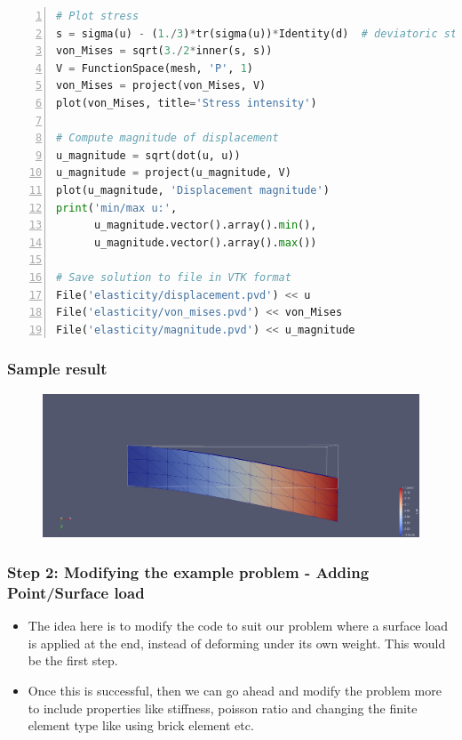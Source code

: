 \documentclass{beamer}
\begin{document}
\begin{frame}
\begin{lstlisting}[language=Python, basicstyle=\ttfamily\tiny,  keywordstyle=\color{blue},  numbers=left,  stepnumber=1, numbersep=10pt, tabsize=4, showspaces=false, showstringspaces=false]
# Plot stress
s = sigma(u) - (1./3)*tr(sigma(u))*Identity(d)  # deviatoric stress
von_Mises = sqrt(3./2*inner(s, s))
V = FunctionSpace(mesh, 'P', 1)
von_Mises = project(von_Mises, V)
plot(von_Mises, title='Stress intensity')

# Compute magnitude of displacement
u_magnitude = sqrt(dot(u, u))
u_magnitude = project(u_magnitude, V)
plot(u_magnitude, 'Displacement magnitude')
print('min/max u:',
      u_magnitude.vector().array().min(),
      u_magnitude.vector().array().max())

# Save solution to file in VTK format
File('elasticity/displacement.pvd') << u
File('elasticity/von_mises.pvd') << von_Mises
File('elasticity/magnitude.pvd') << u_magnitude

\end{lstlisting}
\end{frame}

 \begin{frame}
\frametitle{Sample result}
\begin{figure}
\centering
\includegraphics[width=1\textwidth]{Beam3DFigure}
\end{figure}
\end{frame}


 \begin{frame}
\frametitle{Step 2: Modifying the example problem - Adding Point/Surface load}
\begin{itemize}
		\vfill
		\item{The idea here is to modify the code to suit our problem where a surface load is applied at the end, instead of deforming under its own weight. This would be the first step.}
		\vfill
		\item{Once this is successful, then we can go ahead and modify the problem more to include properties like stiffness, poisson ratio and changing the finite element type like using brick element etc.}
		\vfill
\end{itemize}
\end{frame}
\end{document}
